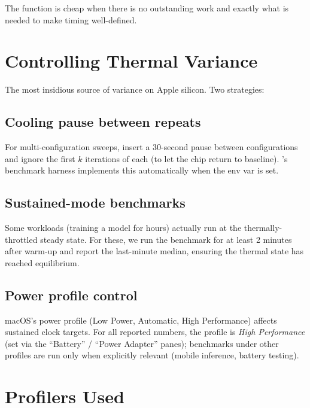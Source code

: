 The function is cheap when there is no outstanding work and
exactly what is needed to make timing well-defined.

\section{Controlling Thermal Variance}
\label{sec:perf_methodology:thermal}

The most insidious source of variance on Apple silicon. Two
strategies:

\subsection{Cooling pause between repeats}
\label{ssec:perf_methodology:cooling}

For multi-configuration sweeps, insert a 30-second pause between
configurations and ignore the first $k$ iterations of each (to
let the chip return to baseline). \Lucid's benchmark harness
implements this automatically when the
 env var is set.

\subsection{Sustained-mode benchmarks}
\label{ssec:perf_methodology:sustained}

Some workloads (training a model for hours) actually run at the
thermally-throttled steady state. For these, we run the
benchmark for at least 2 minutes after warm-up and report the
last-minute median, ensuring the thermal state has reached
equilibrium.

\subsection{Power profile control}
\label{ssec:perf_methodology:power_profile}

macOS's power profile (Low Power, Automatic, High Performance)
affects sustained clock targets. For all reported numbers, the
profile is \emph{High Performance} (set via the
``Battery'' / ``Power Adapter'' panes); benchmarks under other
profiles are run only when explicitly relevant (mobile
inference, battery testing).

\section{Profilers Used}
\label{sec:perf_methodology:profilers}

